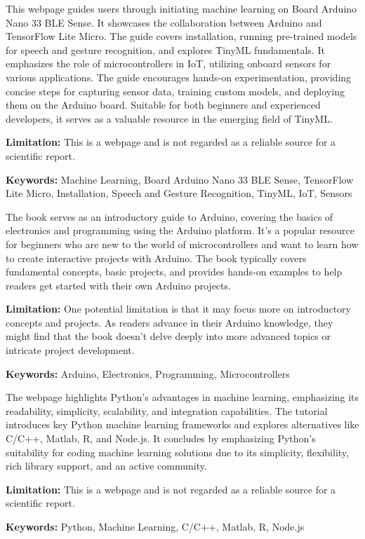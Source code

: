 { 
	
	
	This webpage \cite{Arduino:2023} guides users through initiating machine learning on Board Arduino Nano 33 BLE Sense. It showcases the collaboration between Arduino and TensorFlow Lite Micro. The guide covers installation, running pre-trained models for speech and gesture recognition, and explores TinyML fundamentals. It emphasizes the role of microcontrollers in IoT, utilizing onboard sensors for various applications. The guide encourages hands-on experimentation, providing concise steps for capturing sensor data, training custom models, and deploying them on the Arduino board. Suitable for both beginners and experienced developers, it serves as a valuable resource in the emerging field of TinyML.
	
	\bigskip
	
	\textbf{Limitation:} This is a webpage and is not regarded as a reliable source for a scientific report.
	
	\scriptsize{\textbf{Keywords:} Machine Learning, Board Arduino Nano 33 BLE Sense, TensorFlow Lite Micro, Installation, Speech and Gesture Recognition, TinyML, IoT, Sensors}
}


{ 
	
	The book \cite{Banzi:2022} serves as an introductory guide to Arduino, covering the basics of electronics and programming using the Arduino platform. It's a popular resource for beginners who are new to the world of microcontrollers and want to learn how to create interactive projects with Arduino. The book typically covers fundamental concepts, basic projects, and provides hands-on examples to help readers get started with their own Arduino projects.
	
	\bigskip
	
	\textbf{Limitation:} One potential limitation is that it may focus more on introductory concepts and projects. As readers advance in their Arduino knowledge, they might find that the book doesn't delve deeply into more advanced topics or intricate project development. 
	
	\scriptsize{\textbf{Keywords:} Arduino, Electronics, Programming, Microcontrollers}
}


{ 
	
	The webpage \cite{Bhargav:2023} highlights Python's advantages in machine learning, emphasizing its readability, simplicity, scalability, and integration capabilities. The tutorial introduces key Python machine learning frameworks and explores alternatives like C/C++, Matlab, R, and Node.js. It concludes by emphasizing Python's suitability for coding machine learning solutions due to its simplicity, flexibility, rich library support, and an active community.
	
	\bigskip
	
	\textbf{Limitation:} This is a webpage and is not regarded as a reliable source for a scientific report.
	
	\scriptsize{\textbf{Keywords:} Python, Machine Learning, C/C++, Matlab, R, Node.js}
}


